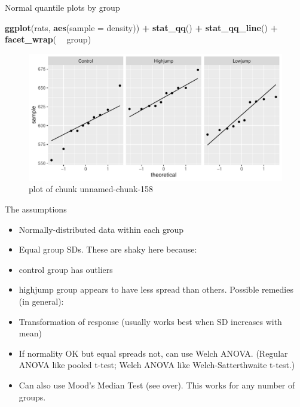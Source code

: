 \documentclass[ignorenonframetext,]{beamer}
\newenvironment{Shaded}{\begin{snugshade}}{\end{snugshade}}
\newcommand{\DataTypeTok}[1]{\textcolor[rgb]{0.13,0.29,0.53}{#1}}
\newcommand{\KeywordTok}[1]{\textcolor[rgb]{0.13,0.29,0.53}{\textbf{#1}}}
\newcommand{\NormalTok}[1]{#1}
\newcommand{\OperatorTok}[1]{\textcolor[rgb]{0.81,0.36,0.00}{\textbf{#1}}}
\newcommand{\StringTok}[1]{\textcolor[rgb]{0.31,0.60,0.02}{#1}}
\providecommand{\tightlist}{%
  \setlength{\itemsep}{0pt}\setlength{\parskip}{0pt}}
\begin{document}
\begin{frame}[fragile]{Normal quantile plots by group}
\protect\hypertarget{normal-quantile-plots-by-group}{}

\begin{Shaded}
\begin{Highlighting}[]
\KeywordTok{ggplot}\NormalTok{(rats, }\KeywordTok{aes}\NormalTok{(}\DataTypeTok{sample =}\NormalTok{ density)) }\OperatorTok{+}\StringTok{ }\KeywordTok{stat_qq}\NormalTok{() }\OperatorTok{+}\StringTok{ }
\StringTok{  }\KeywordTok{stat_qq_line}\NormalTok{() }\OperatorTok{+}\StringTok{ }\KeywordTok{facet_wrap}\NormalTok{( }\OperatorTok{~}\StringTok{ }\NormalTok{group)}
\end{Highlighting}
\end{Shaded}

\begin{figure}
\centering
\includegraphics{figure/unnamed-chunk-158-1.pdf}
\caption{plot of chunk unnamed-chunk-158}
\end{figure}

\end{frame}

\begin{frame}{The assumptions}
\protect\hypertarget{the-assumptions}{}

\begin{itemize}
\tightlist
\item
  Normally-distributed data within each group
\item
  Equal group SDs. These are shaky here because:
\item
  control group has outliers
\item
  highjump group appears to have less spread than others. Possible
  remedies (in general):
\item
  Transformation of response (usually works best when SD increases with
  mean)
\item
  If normality OK but equal spreads not, can use Welch ANOVA. (Regular
  ANOVA like pooled t-test; Welch ANOVA like Welch-Satterthwaite
  t-test.)
\item
  Can also use Mood's Median Test (see over). This works for any number
  of groups.
\end{itemize}

\end{frame}
\end{document}
